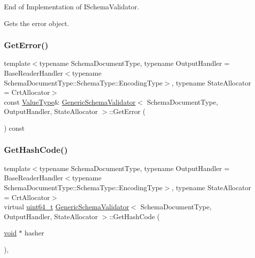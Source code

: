End of Implementation of I\+Schema\+Validator. 

Gets the error object. \mbox{\label{classGenericSchemaValidator_a15bad1493265a83928c869dbeb034ef0}} 
\subsubsection{\texorpdfstring{Get\+Error()}{GetError()}\hspace{0.1cm}{\footnotesize\ttfamily [2/2]}}
{\footnotesize\ttfamily template$<$typename Schema\+Document\+Type, typename Output\+Handler = Base\+Reader\+Handler$<$typename Schema\+Document\+Type\+::\+Schema\+Type\+::\+Encoding\+Type$>$, typename State\+Allocator = Crt\+Allocator$>$ \\
const \hyperlink{classGenericSchemaValidator_a435890a2dddeecb896d4ac76de03ca68}{Value\+Type}\& \hyperlink{classGenericSchemaValidator}{Generic\+Schema\+Validator}$<$ Schema\+Document\+Type, Output\+Handler, State\+Allocator $>$\+::Get\+Error (\begin{DoxyParamCaption}{ }\end{DoxyParamCaption}) const\hspace{0.3cm}{\ttfamily [inline]}}

\mbox{\label{classGenericSchemaValidator_ac01c45982a1f512e1ca06fe5544b0c0f}} 
\subsubsection{\texorpdfstring{Get\+Hash\+Code()}{GetHashCode()}}
{\footnotesize\ttfamily template$<$typename Schema\+Document\+Type, typename Output\+Handler = Base\+Reader\+Handler$<$typename Schema\+Document\+Type\+::\+Schema\+Type\+::\+Encoding\+Type$>$, typename State\+Allocator = Crt\+Allocator$>$ \\
virtual \hyperlink{stdint_8h_aec6fcb673ff035718c238c8c9d544c47}{uint64\+\_\+t} \hyperlink{classGenericSchemaValidator}{Generic\+Schema\+Validator}$<$ Schema\+Document\+Type, Output\+Handler, State\+Allocator $>$\+::Get\+Hash\+Code (\begin{DoxyParamCaption}\item[{\hyperlink{imgui__impl__opengl3__loader_8h_ac668e7cffd9e2e9cfee428b9b2f34fa7}{void} $\ast$}]{hasher }\end{DoxyParamCaption})\hspace{0.3cm}{\ttfamily [inline]}, {\ttfamily [virtual]}}




